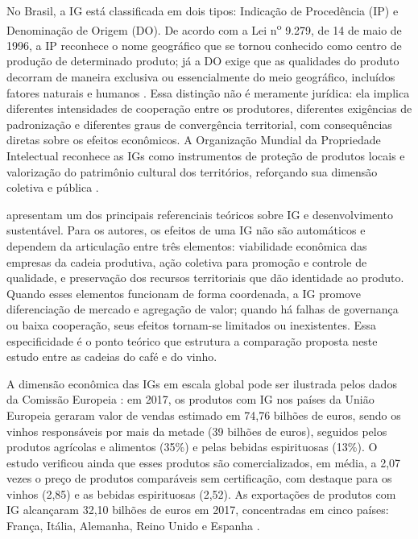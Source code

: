 \documentclass[12pt, a4paper]{article}
\begin{document}
No Brasil, a IG está classificada em dois tipos: Indicação de Procedência (IP) e Denominação de Origem (DO). De acordo com a Lei n\textsuperscript{o} 9.279, de 14 de maio de 1996, a IP reconhece o nome geográfico que se tornou conhecido como centro de produção de determinado produto; já a DO exige que as qualidades do produto decorram de maneira exclusiva ou essencialmente do meio geográfico, incluídos fatores naturais e humanos \citep{brasil1996}. Essa distinção não é meramente jurídica: ela implica diferentes intensidades de cooperação entre os produtores, diferentes exigências de padronização e diferentes graus de convergência territorial, com consequências diretas sobre os efeitos econômicos. A Organização Mundial da Propriedade Intelectual reconhece as IGs como instrumentos de proteção de produtos locais e valorização do patrimônio cultural dos territórios, reforçando sua dimensão coletiva e pública \citep{ompi2022}.

\citet{belletti2017} apresentam um dos principais referenciais teóricos sobre IG e desenvolvimento sustentável. Para os autores, os efeitos de uma IG não são automáticos e dependem da articulação entre três elementos: viabilidade econômica das empresas da cadeia produtiva, ação coletiva para promoção e controle de qualidade, e preservação dos recursos territoriais que dão identidade ao produto. Quando esses elementos funcionam de forma coordenada, a IG promove diferenciação de mercado e agregação de valor; quando há falhas de governança ou baixa cooperação, seus efeitos tornam-se limitados ou inexistentes. Essa especificidade é o ponto teórico que estrutura a comparação proposta neste estudo entre as cadeias do café e do vinho.

A dimensão econômica das IGs em escala global pode ser ilustrada pelos dados da Comissão Europeia \citeyear{european2020}: em 2017, os produtos com IG nos países da União Europeia geraram valor de vendas estimado em 74,76 bilhões de euros, sendo os vinhos responsáveis por mais da metade (39 bilhões de euros), seguidos pelos produtos agrícolas e alimentos (35\%) e pelas bebidas espirituosas (13\%). O estudo verificou ainda que esses produtos são comercializados, em média, a 2,07 vezes o preço de produtos comparáveis sem certificação, com destaque para os vinhos (2,85) e as bebidas espirituosas (2,52). As exportações de produtos com IG alcançaram 32,10 bilhões de euros em 2017, concentradas em cinco países: França, Itália, Alemanha, Reino Unido e Espanha \citep{european2020}.
\end{document}
